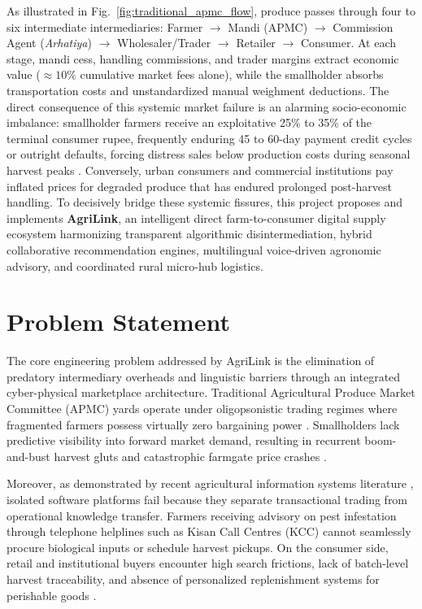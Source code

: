 As illustrated in Fig.~\ref{fig:traditional_apmc_flow}, produce passes through four to six intermediate intermediaries: Farmer $\rightarrow$ Mandi (APMC) $\rightarrow$ Commission Agent (\textit{Arhatiya}) $\rightarrow$ Wholesaler/Trader $\rightarrow$ Retailer $\rightarrow$ Consumer. At each stage, mandi cess, handling commissions, and trader margins extract economic value ($\approx 10\%$ cumulative market fees alone), while the smallholder absorbs transportation costs and unstandardized manual weighment deductions. The direct consequence of this systemic market failure is an alarming socio-economic imbalance: smallholder farmers receive an exploitative 25\% to 35\% of the terminal consumer rupee, frequently enduring 45 to 60-day payment credit cycles or outright defaults, forcing distress sales below production costs during seasonal harvest peaks \cite{NITIAayog2018}. Conversely, urban consumers and commercial institutions pay inflated prices for degraded produce that has endured prolonged post-harvest handling. To decisively bridge these systemic fissures, this project proposes and implements \textbf{AgriLink}, an intelligent direct farm-to-consumer digital supply ecosystem harmonizing transparent algorithmic disintermediation, hybrid collaborative recommendation engines, multilingual voice-driven agronomic advisory, and coordinated rural micro-hub logistics.

\section{Problem Statement}
\label{sec:prob_stmt}
The core engineering problem addressed by AgriLink is the elimination of predatory intermediary overheads and linguistic barriers through an integrated cyber-physical marketplace architecture. Traditional Agricultural Produce Market Committee (APMC) yards operate under oligopsonistic trading regimes where fragmented farmers possess virtually zero bargaining power \cite{Sedek2021}. Smallholders lack predictive visibility into forward market demand, resulting in recurrent boom-and-bust harvest gluts and catastrophic farmgate price crashes \cite{Rehman2024}. 

Moreover, as demonstrated by recent agricultural information systems literature \cite{Glaros2023, Koksal2019}, isolated software platforms fail because they separate transactional trading from operational knowledge transfer. Farmers receiving advisory on pest infestation through telephone helplines such as Kisan Call Centres (KCC) cannot seamlessly procure biological inputs or schedule harvest pickups. On the consumer side, retail and institutional buyers encounter high search frictions, lack of batch-level harvest traceability, and absence of personalized replenishment systems for perishable goods \cite{Sarwar2001, Ariannezhad2022}. 

